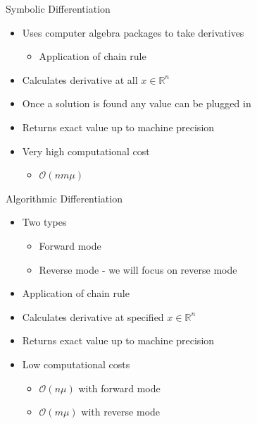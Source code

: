 \documentclass{beamer}
\begin{document}
\begin{frame}{Symbolic Differentiation}
    \begin{itemize}
        \item Uses computer algebra packages to take derivatives
        \begin{itemize}
            \item Application of chain rule
        \end{itemize}
        \item Calculates derivative at all $x \in \mathbb{R}^n$
        \item Once a solution is found any value can be plugged in
        \item Returns \alert{exact} value up to machine precision
        \item Very high computational cost
        \begin{itemize}
            \item $\mathcal{O}(nm \mu)$
        \end{itemize}
    \end{itemize}
\end{frame}

\begin{frame}{Algorithmic Differentiation}
    \begin{itemize}
        \item Two types
            \begin{itemize}
                \item Forward mode
                \item Reverse mode - we will focus on reverse mode
            \end{itemize}
        \item Application of chain rule
        \item Calculates derivative at specified $x \in \mathbb{R}^n$
        \item Returns \alert{exact} value up to machine precision
        \item Low computational costs
            \begin{itemize}
                \item $\mathcal{O}(n \mu)$ with forward mode
                \item $\mathcal{O}(m \mu)$ with reverse mode
            \end{itemize}
    \end{itemize}
\end{frame}
\end{document}
